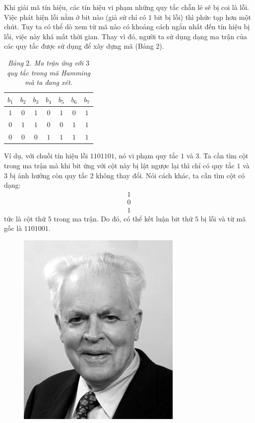 \begin{multicols}{2}
	Khi giải mã tín hiệu, các tín hiệu vi phạm những quy tắc chẵn lẻ sẽ bị coi là lỗi. Việc phát hiện lỗi nằm ở bit nào (giả sử chỉ có $1$ bit bị lỗi) thì phức tạp hơn một chút. Tuy ta có thể dò xem từ mã nào có khoảng cách ngắn nhất đến tín hiệu bị lỗi, việc này khá mất thời gian. Thay vì đó, người ta sử dụng dạng ma trận của các quy tắc được sử dụng để xây dựng mã (Bảng $2$).
	\begin{table}[H]
		\vspace*{-5pt}
		\centering
		\captionsetup{labelformat= empty, justification=centering}
		\begin{tabular}{ccccccc}
			\hline
			$b_1$ & $b_2$& $b_3$& $b_4$&$b_5$ &$b_6$ &$b_7$\\
			\hline
			$1$ & $0$&$1$&$0$&$1$&$0$&$1$\\
			$0$ & $1$&$1$&$0$&$0$&$1$&$1$\\
			$0$ & $0$&$0$&$1$&$1$&$1$&$1$\\
		\end{tabular}	
		\caption{\small\textit{\color{toanhocdoisong}Bảng $2$. Ma trận ứng với $3$ quy tắc trong mã Hamming mà ta đang xét.}}
		\vspace*{-10pt}
	\end{table}
	Ví dụ, với chuỗi tín hiệu lỗi $1101101$, nó vi phạm quy tắc $1$ và $3$. Ta cần tìm cột trong ma trận mà khi bit ứng với cột này bị lật ngược lại thì chỉ có quy tắc $1$ và $3$ bị ảnh hưởng còn quy tắc $2$ không thay đổi. Nói cách khác, ta cần tìm cột có dạng:
	\begin{align*}
		1\\[-0.5ex]
		0\\[-0.5ex]
		1
	\end{align*}
	tức là cột thứ $5$ trong ma trận. Do đó, có thể kết luận bit thứ $5$ bị lỗi và từ mã gốc là $1101001$.
		\begin{figure}[H]
		\vspace*{-5pt}
		\centering
		\captionsetup{labelformat= empty, justification=centering}
		\includegraphics[height= 0.575\linewidth]{2}

\end{figure}
\end{multicols}
